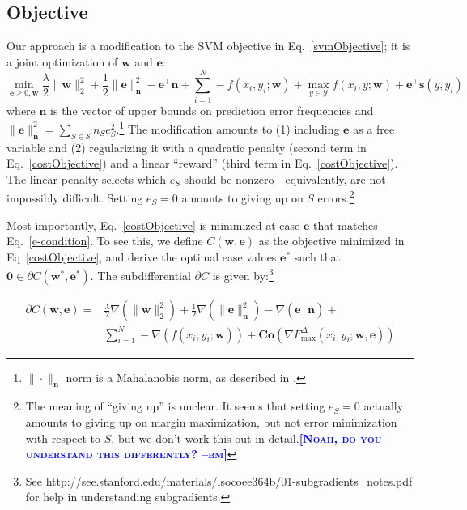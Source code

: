 \documentclass{article} %
\newcommand{\bmcomment}[1]{\textcolor{blue}{\textsc{\textbf{[#1 --bm]}}}}
\begin{document}
\subsection{Objective}

Our approach is a modification to the SVM objective in
Eq.~\ref{svmObjective}; it is a joint optimization of $\mathbf{w}$ and $\mathbf{e}$:
\begin{equation}
\label{costObjective}
\min_{\mathbf{e}\geq 0,\mathbf{w}} \frac{\lambda}{2}\|\mathbf{w}\|_2^2
+ \frac{1}{2} \|\mathbf{e}\|_{\mathbf{n}}^2 - \mathbf{e}^\top
\mathbf{n} + \sum_{i=1}^N -f(x_i,y_i; \mathbf{w})  + \max_{y \in
  \mathcal{Y}} f(x_i,y ; \mathbf{w}) + \mathbf{e}^\top \mathbf{s}(y, y_i)
\end{equation}
where $\mathbf{n}$ is the vector of upper bounds on prediction error
frequencies and 
$\|\mathbf{e}\|_{\mathbf{n}}^2 = \sum_{S \in
  \mathcal{S}} n_Se_S^2$.\footnote{$\|\cdot\|_{\mathbf{n}}$ norm is
  a Mahalanobis norm, as described in
  \citep{mahalanobis1936generalized}.} 
 The modification amounts to (1) including
$\mathbf{e}$ as a free variable and (2) regularizing it with a quadratic
penalty (second term in Eq.~\ref{costObjective}) and a linear ``reward''
(third term in Eq.~\ref{costObjective}).  The linear penalty selects
which $e_S$ should be nonzero---equivalently, are not impossibly
difficult. Setting $e_S=0$ amounts to giving up on $S$
errors.\footnote{The meaning of ``giving up'' is unclear.  It seems
that setting $e_S=0$ actually amounts to giving up on margin maximization,
but not error minimization with respect to $S$, but we don't work 
this out in detail.\bmcomment{Noah, do you understand
this differently?}}

Most importantly, Eq.~\ref{costObjective} is minimized at ease
 $\mathbf{e}$ 
that matches Eq.~\ref{e-condition}.  To see this, we define 
$C(\mathbf{w},\mathbf{e})$ as the objective minimized in 
Eq~\ref{costObjective}, and derive the optimal ease 
values $\mathbf{e}^*$
such that $\mathbf{0}\in \partial C(\mathbf{w}^*,\mathbf{e}^*)$.  
The subdifferential $\partial C$ is given by:\footnote{See
 \url{http://see.stanford.edu/materials/lsocoee364b/01-subgradients_notes.pdf} for help in understanding subgradients.}

\begin{equation}
\label{subdifferential}
\begin{split}
\partial C(\mathbf{w},\mathbf{e}) = & \frac{\lambda}{2}\nabla (\|\mathbf{w}\|_2^2)
+\frac{1}{2}\nabla (\|\mathbf{e}\|^2_{\mathbf{n}})-\nabla (\mathbf{e}^\top \mathbf{n})
+ \\ 
& \sum_{i=1}^N -\nabla (f(x_i,y_i; \mathbf{w}))+ 
\mathbf{Co}(\nabla F^{\Delta}_{\max}(x_i,y_i;\mathbf{w},\mathbf{e}))
\end{split}
\end{equation}
\end{document}
